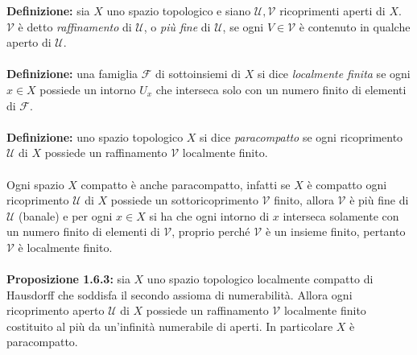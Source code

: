 \documentclass{article}
\begin{document}
\textbf{Definizione:} sia $X$ uno spazio topologico e siano $\mathcal{U}, \mathcal{V}$ ricoprimenti aperti di $X$. $\mathcal{V}$ è detto \textit{raffinamento} di $\mathcal{U}$, o \textit{più fine} di $\mathcal{U}$, se ogni $V \in \mathcal{V}$ è contenuto in qualche aperto di $\mathcal{U}$. \\ \\
\textbf{Definizione:} una famiglia $\mathcal{F}$ di sottoinsiemi di $X$ si dice \textit{localmente finita} se ogni $x \in X$ possiede un intorno $U_x$ che interseca solo con un numero finito di elementi di $\mathcal{F}$. \\ \\
\textbf{Definizione:} uno spazio topologico $X$ si dice \textit{paracompatto} se ogni ricoprimento $\mathcal{U}$ di $X$ possiede un raffinamento $\mathcal{V}$ localmente finito. \\ \\
Ogni spazio $X$ compatto è anche paracompatto, infatti se $X$ è compatto ogni ricoprimento $\mathcal{U}$ di $X$ possiede un sottoricoprimento $\mathcal{V}$ finito, allora $\mathcal{V}$ è più fine di $\mathcal{U}$ (banale) e per ogni $x \in X$ si ha che ogni intorno di $x$ interseca solamente con un numero finito di elementi di $\mathcal{V}$, proprio perché $\mathcal{V}$ è un insieme finito, pertanto $\mathcal{V}$ è localmente finito. \\ \\
\textbf{Proposizione 1.6.3:} sia $X$ uno spazio topologico localmente compatto di Hausdorff che soddisfa il secondo assioma di numerabilità. Allora ogni ricoprimento aperto $\mathcal{U}$ di $X$ possiede un raffinamento $\mathcal{V}$ localmente finito costituito al più da un'infinità numerabile di aperti. In particolare $X$ è paracompatto. \\
\end{document}
